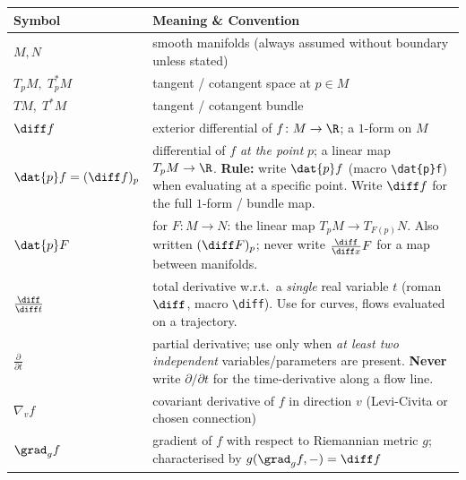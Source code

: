 \begin{longtable}{@{} p{4cm} p{10cm} @{}}
	\toprule
	\textbf{Symbol} & \textbf{Meaning \& Convention} \\
	\midrule
	\endhead
	
	$M, N$ & smooth manifolds (always assumed without boundary unless stated) \\[4pt]
	
	$T_p M,\; T^*_p M$ & tangent / cotangent space at $p \in M$ \\[4pt]
	
	$TM,\; T^*M$ & tangent / cotangent bundle \\[4pt]
	
	$\diff f$ & exterior differential of $f\colon M\to\R$; a $1$-form on $M$ \\[4pt]
	
	$\dat{p} f = (\diff f)_p$ & differential of $f$ \emph{at the point} $p$;
	a linear map $T_p M \to \R$.
	\newline
	\textbf{Rule:} write $\dat{p}f$ (macro \texttt{\textbackslash dat\{p\}f})
	when evaluating at a specific point.
	Write $\diff f$ for the full $1$-form / bundle map.\\[4pt]
	
	$\dat{p} F$ & for $F\colon M\to N$: the linear map $T_p M\to T_{F(p)}N$.
	Also written $({\diff F})_p$; never write $\frac{\diff}{\diff x}F$
	for a map between manifolds. \\[4pt]
	
	$\frac{\diff}{\diff t}$
	& total derivative w.r.t.\ a \emph{single} real variable $t$
	(roman~$\diff$, macro \texttt{\textbackslash diff}).
	Use for curves, flows evaluated on a trajectory. \\[4pt]
	
	$\frac{\partial}{\partial t}$
	& partial derivative; use only when \emph{at least two independent}
	variables/parameters are present.
	\textbf{Never} write $\partial/\partial t$ for the time-derivative along
	a flow line. \\[4pt]
	
	$\nabla_v f$ & covariant derivative of $f$ in direction $v$
	(Levi-Civita or chosen connection) \\[4pt]
	
	$\grad_g f$ & gradient of $f$ with respect to Riemannian metric $g$;
	characterised by $g(\grad_g f, -) = \diff f$ \\[4pt]
	
	\bottomrule
\end{longtable}

